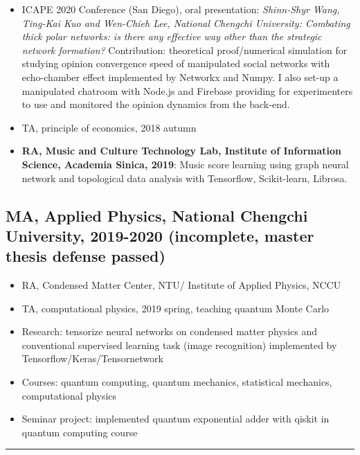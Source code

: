 \documentclass[11pt]{article}
\begin{document}
\begin{multicols*}{2}
    \begin{itemize}[noitemsep]
        \item ICAPE 2020 Conference (San Diego), oral presentation: \textit{Shinn-Shyr Wang, Ting-Kai Kuo and Wen-Chieh Lee, National Chengchi University: Combating thick polar networks: is there any effective way other than the strategic network formation?} Contribution: theoretical proof/numerical simulation for studying opinion convergence speed of manipulated social networks with echo-chamber effect implemented by Networkx and Numpy. I also set-up a manipulated chatroom with Node.js and Firebase providing for experimenters to use and monitored the opinion dynamics from the back-end.
        \item TA, principle of economics, 2018 autumn
    
        \item \textbf{RA, Music and Culture Technology Lab, Institute of Information Science, Academia Sinica, 2019}: Music score learning using graph neural network and topological data analysis with Tensorflow, Scikit-learn, Librosa.
        
    \end{itemize}

\subsection*{MA, Applied Physics, National Chengchi University, 2019-2020 (incomplete, master thesis defense passed)}

    \begin{itemize}[noitemsep]
        \item RA, Condensed Matter Center, NTU/ Institute of Applied Physics, NCCU
        \item TA, computational physics, 2019 spring, teaching quantum Monte Carlo
        \item Research: tensorize neural networks on condensed matter physics and conventional supervised learning task (image recognition) implemented by Tensorflow/Keras/Tensornetwork
        \item Courses: quantum computing, quantum mechanics, statistical mechanics, computational physics
        \item Seminar project: implemented quantum exponential adder with qiskit in quantum computing course 
    \end{itemize}

\hrule


\end{multicols*}
\end{document}
